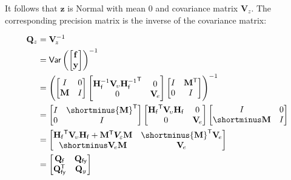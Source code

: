 \documentclass[notitlepage,a4paper,12pt]{article}
\newcommand{\transpose}[1]{{#1}^{\sf{T}}}
\begin{document}
It follows that $\mathbf{z}$ is Normal with mean 0 and covariance matrix $\mathbf{V}_{\!z}$. The corresponding precision matrix is the inverse of the covariance matrix: 

\begin{align*}
    \mathbf{Q}_z 
    &= 
    \mathbf{V}^{-1}_{\!z} \\
    &= 
    \text{\sf{Var}}\left(
    \begin{bmatrix}
        \mathbf{f} \\
        \mathbf{y}
    \end{bmatrix}
    \right)^{-1} \\
    &=  
    \left(
    \begin{bmatrix}
        I & 0 \\
        \mathbf{M} & I
    \end{bmatrix}
    \begin{bmatrix}
        \mathbf{H}_{\sf{f}}^{-1} \mathbf{V}_{\!\upsilon} \transpose{\mathbf{H}_{\sf{f}}^{-1}} & 0 \\
        0 & \mathbf{V}_{\!e}
    \end{bmatrix} 
    \begin{bmatrix}
        I & \transpose{\mathbf{M}} \\
        0 & I
    \end{bmatrix}
    \right)^{-1}\\
    &=
    \begin{bmatrix}
        I & \shortminus\transpose{\mathbf{M}} \\
        0 & I
    \end{bmatrix}
    \begin{bmatrix}
        \transpose{\mathbf{H}_{\sf{f}}} \mathbf{V}_{\!\upsilon} \mathbf{H}_{\sf{f}} & 0 \\
        0 & \mathbf{V}_{\!e}
    \end{bmatrix} 
    \begin{bmatrix}
        I & 0 \\
        \shortminus\mathbf{M} & I 
    \end{bmatrix} \\
    &=
    \begin{bmatrix}
         \transpose{\mathbf{H}_{\sf{f}}} \mathbf{V}_{\!\upsilon} \mathbf{H}_{\sf{f}} + \transpose{\mathbf{M}}\bm{V}_{\varepsilon}\mathbf{M}  & \shortminus \transpose{\mathbf{M}} \mathbf{V}_{\!e} \\
         \shortminus \mathbf{V}_{\!e} \mathbf{M} & \mathbf{V}_{\!e}
    \end{bmatrix} \\
    &= 
    \begin{bmatrix}
        \mathbf{Q}_{\sf{f}} & \mathbf{Q}_{\sf{f} y} \\
        \transpose{\mathbf{Q}}_{\sf{f} y} & \mathbf{Q}_{y}  
    \end{bmatrix}
\end{align*}
\end{document}
